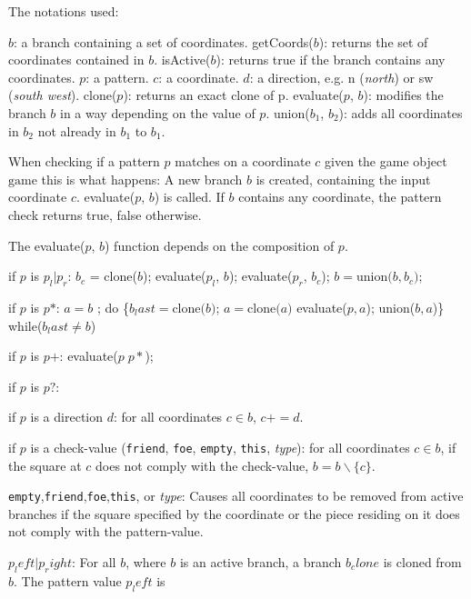 The notations used:

$b$: a branch containing a set of coordinates.
getCoords($b$): returns the set of coordinates contained in $b$.
isActive($b$): returns true if the branch contains any coordinates.
$p$: a pattern.
$c$: a coordinate.
$d$: a direction, e.g. n (\textit{north}) or sw (\textit{south west}).
clone($p$): returns an exact clone of p.
evaluate($p$, $b$): modifies the branch $b$ in a way depending on the value of $p$.
union($b_1$, $b_2$): adds all coordinates in $b_2$ not already in $b_1$ to $b_1$. 

When checking if a pattern $p$ matches on a coordinate $c$ given the game object $\text{game}$ this is what happens:
A new branch $b$ is created, containing the input coordinate $c$. 
evaluate($p$, $b$) is called. If $b$ contains any coordinate, the pattern check returns true, false otherwise.

The evaluate($p$, $b$) function depends on the composition of $p$.
\begin{dlist}
\item if $p$ is $p_l \texttt{|} p_r$: $b_c$ = clone($b$); evaluate($p_l$, $b$); evaluate($p_r$, $b_c$); $b = \text{union(}b, b_c\text{)}$;
\item if $p$ is $p\texttt{*}$: $a = b$ ; do \{$b_last = \text{clone(}b\text{)}$; $a = \text{clone(}a\text{)}$ evaluate($p, a$); union($b, a$)\} while($b_last \neq b$)
\item if $p$ is $p\texttt{+}$: evaluate($p \; p*$);
\item if $p$ is $p\texttt{?}$:
\item if $p$ is a direction $d$: for all coordinates $c \in b$, $c += d$.
\item if $p$ is a check-value (\texttt{friend}, \texttt{foe}, \texttt{empty}, \texttt{this}, \textit{type}): for all coordinates $c \in b$, if the square at $c$ does not comply with the check-value, $b = b \smallsetminus \{c\}$.
\end{dlist}  



\begin{dlist}
\item \texttt{empty},\texttt{friend},\texttt{foe},\texttt{this}, or \textit{type}: Causes all coordinates to be removed from active branches if the square specified by the coordinate or the piece residing on it does not comply with the pattern-value.
\item $p_left \texttt{|} p_right$: For all $b$, where $b$ is an active branch, a branch $b_clone$ is cloned from $b$. The pattern value $p_left$ is 
\end{dlist}
 

